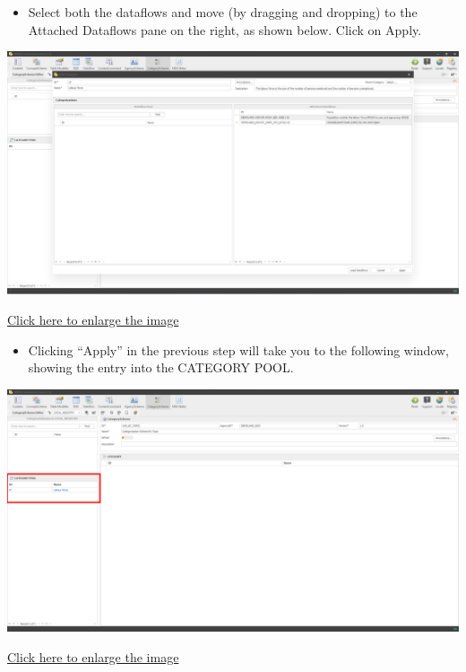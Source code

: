 \documentclass[
]{book}
\providecommand{\tightlist}{%
  \setlength{\itemsep}{0pt}\setlength{\parskip}{0pt}}
\begin{document}
\begin{itemize}
\tightlist
\item
  Select both the dataflows and move (by dragging and dropping) to the Attached Dataflows pane on the right, as shown below. Click on Apply.
\end{itemize}

\begin{center}\includegraphics[width=1\linewidth]{./images/image172} \end{center}

\href{images/image172.png}{Click here to enlarge the image}

\begin{itemize}
\tightlist
\item
  Clicking ``Apply'' in the previous step will take you to the following window, showing the entry into the CATEGORY POOL.
\end{itemize}

\begin{center}\includegraphics[width=1\linewidth]{./images/image174} \end{center}

\href{images/image174.png}{Click here to enlarge the image}
\end{document}
